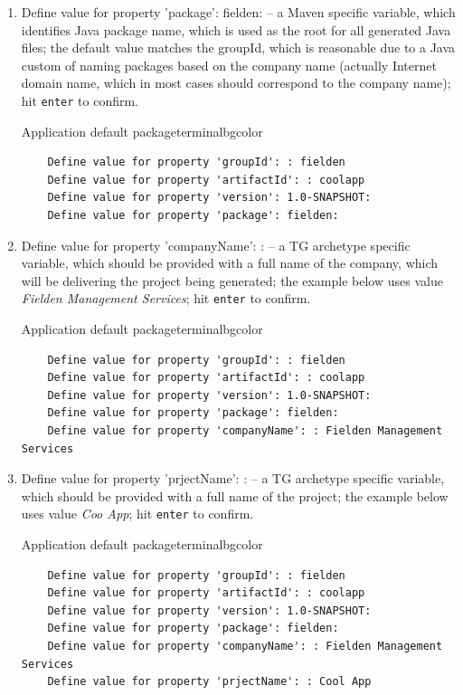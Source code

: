 \begin{enumerate}
    \item Define value for property 'package': fielden: -- a Maven specific variable, which identifies Java package name, which is used as the root for all generated Java files; the default value matches the groupId, which is reasonable due to a Java custom of naming packages based on the company name (actually Internet domain name, which in most cases should correspond to the company name); hit \texttt{enter} to confirm.
    \vspace*{-20pt}
    \begin{code}{Application default package}{\label{lst::archetype-package}}{terminalbgcolor}
      \begin{lstlisting}
	Define value for property 'groupId': : fielden		
	Define value for property 'artifactId': : coolapp
	Define value for property 'version': 1.0-SNAPSHOT:
	Define value for property 'package': fielden:
      \end{lstlisting}
    \end{code}

    \item Define value for property 'companyName': : -- a TG archetype specific variable, which should be provided with a full name of the company, which will be delivering the project being generated; the example below uses value \emph{Fielden Management Services}; hit \texttt{enter} to confirm.
    \vspace*{-20pt}
    \begin{code}{Application default package}{\label{lst::archetype-package}}{terminalbgcolor}
      \begin{lstlisting}
	Define value for property 'groupId': : fielden		
	Define value for property 'artifactId': : coolapp
	Define value for property 'version': 1.0-SNAPSHOT:
	Define value for property 'package': fielden:
	Define value for property 'companyName': : Fielden Management Services
      \end{lstlisting}
    \end{code}

    \item Define value for property 'prjectName': : -- a TG archetype specific variable, which should be provided with a full name of the project; the example below uses value \emph{Coo App}; hit \texttt{enter} to confirm.
    \vspace*{-20pt}
    \begin{code}{Application default package}{\label{lst::archetype-package}}{terminalbgcolor}
      \begin{lstlisting}
	Define value for property 'groupId': : fielden		
	Define value for property 'artifactId': : coolapp
	Define value for property 'version': 1.0-SNAPSHOT:
	Define value for property 'package': fielden:
	Define value for property 'companyName': : Fielden Management Services
	Define value for property 'prjectName': : Cool App
      \end{lstlisting}
    \end{code}


\end{enumerate}
